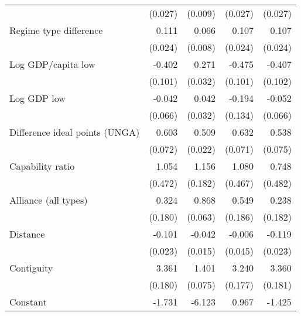 \begin{table}[htbp]
\begin{tabular}{l*{4}{D{.}{.}{-1}}}
   &     (0.027)         &     (0.009)         &     (0.027)         &     (0.027)         \\
\addlinespace
Regime type difference&       0.111\sym{***}&      0.066\sym{***}&       0.107\sym{***}&       0.107\sym{***}\\
   &     (0.024)         &     (0.008)         &     (0.024)         &     (0.024)         \\
\addlinespace
Log GDP/capita low&      -0.402\sym{***}&       0.271\sym{***}&      -0.475\sym{***}&      -0.407\sym{***}\\
   &     (0.101)         &     (0.032)         &     (0.101)         &     (0.102)         \\
\addlinespace
Log GDP low&     -0.042         &      0.042        &      -0.194         &     -0.052         \\
   &     (0.066)         &     (0.032)         &     (0.134)         &     (0.066)         \\
\addlinespace
Difference ideal points (UNGA)&       0.603\sym{***}&       0.509\sym{***}&       0.632\sym{***}&       0.538\sym{***}\\
   &     (0.072)         &     (0.022)         &     (0.071)         &     (0.075)         \\
\addlinespace
Capability ratio&       1.054\sym{*}  &       1.156\sym{***}&       1.080\sym{*}  &       0.748         \\
   &     (0.472)         &     (0.182)         &     (0.467)         &     (0.482)         \\
\addlinespace
Alliance (all types)&       0.324\sym{+}  &       0.868\sym{***}&       0.549\sym{**} &       0.238         \\
   &     (0.180)         &     (0.063)         &     (0.186)         &     (0.182)         \\
\addlinespace
Distance&      -0.101\sym{***}&     -0.042\sym{**} &    -0.006         &      -0.119\sym{***}\\
   &     (0.023)         &     (0.015)         &     (0.045)         &     (0.023)         \\
\addlinespace
Contiguity&       3.361\sym{***}&       1.401\sym{***}&       3.240\sym{***}&       3.360\sym{***}\\
   &     (0.180)         &     (0.075)         &     (0.177)         &     (0.181)         \\
\addlinespace
Constant&      -1.731         &      -6.123\sym{***}&       0.967         &      -1.425         \\

\end{tabular}
\end{table}
